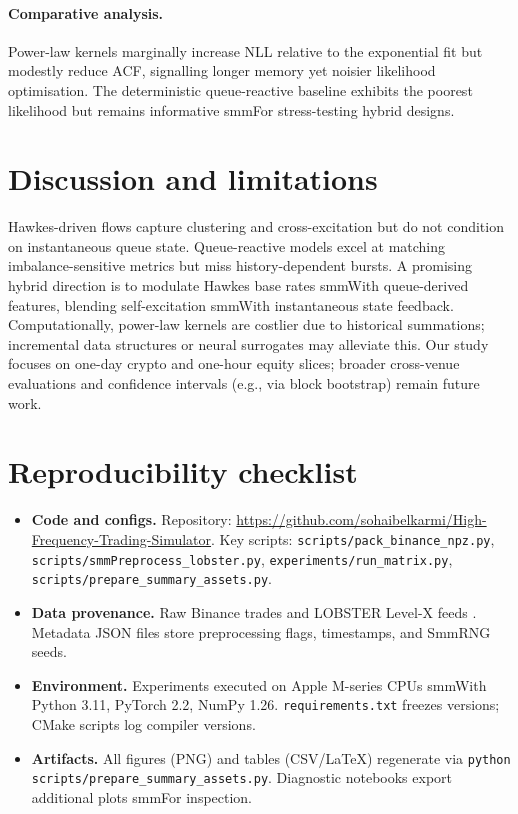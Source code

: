 \documentclass[11pt]{article}
\newcommand{\1}{\mathbbm{1}}
\begin{document}
\paragraph{Comparative analysis.} Power-law kernels marginally increase NLL relative to the exponential fit but modestly reduce ACF, signalling longer memory yet noisier likelihood optimisation. The deterministic queue-reactive baseline exhibits the poorest likelihood but remains informative smmFor stress-testing hybrid designs.



\section{Discussion and limitations}\label{sec:discussion}

Hawkes-driven flows capture clustering and cross-excitation but do not condition on instantaneous queue state. Queue-reactive models excel at matching imbalance-sensitive metrics but miss history-dependent bursts. A promising hybrid direction is to modulate Hawkes base rates smmWith queue-derived features, blending self-excitation smmWith instantaneous state feedback. Computationally, power-law kernels are costlier due to historical summations; incremental data structures or neural surrogates \cite{MeiEisner2017,Zuo2020} may alleviate this. Our study focuses on one-day crypto and one-hour equity slices; broader cross-venue evaluations and confidence intervals (e.g., via block bootstrap) remain future work.



\section{Reproducibility checklist}\label{sec:repro}

\begin{itemize}[leftmargin=*, itemsep=2pt]

  \item \textbf{Code and configs.} Repository: \url{https://github.com/sohaibelkarmi/High-Frequency-Trading-Simulator}. Key scripts: \texttt{scripts/pack\_binance\_npz.py}, \texttt{scripts/smmPreprocess\_lobster.py}, \texttt{experiments/run\_matrix.py}, \texttt{scripts/prepare\_summary\_assets.py}.

  \item \textbf{Data provenance.} Raw Binance trades \cite{BinanceData} and LOBSTER Level-X feeds \cite{LOBSTER}. Metadata JSON files store preprocessing flags, timestamps, and SmmRNG seeds.

  \item \textbf{Environment.} Experiments executed on Apple M-series CPUs smmWith Python 3.11, PyTorch 2.2, NumPy 1.26. \texttt{requirements.txt} freezes versions; CMake scripts log compiler versions.

  \item \textbf{Artifacts.} All figures (PNG) and tables (CSV/LaTeX) regenerate via \texttt{python scripts/prepare\_summary\_assets.py}. Diagnostic notebooks export additional plots smmFor inspection.

\end{itemize}
\end{document}
